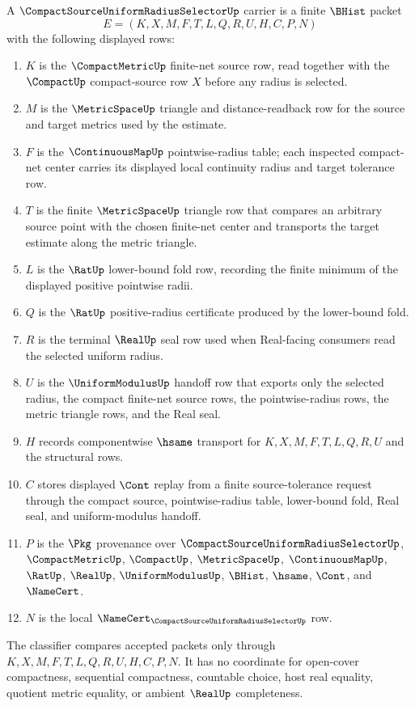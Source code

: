 \begin{definition}
\label{def:compact-source-uniform-radius-selector-carrier}
A $\CompactSourceUniformRadiusSelectorUp$ carrier is a finite $\BHist$ packet
$$
E=(K,X,M,F,T,L,Q,R,U,H,C,P,N)
$$
with the following displayed rows:
\begin{enumerate}
\item $K$ is the $\CompactMetricUp$ finite-net source row, read together with the $\CompactUp$ compact-source row $X$ before any radius is selected.
\item $M$ is the $\MetricSpaceUp$ triangle and distance-readback row for the source and target metrics used by the estimate.
\item $F$ is the $\ContinuousMapUp$ pointwise-radius table; each inspected compact-net center carries its displayed local continuity radius and target tolerance row.
\item $T$ is the finite $\MetricSpaceUp$ triangle row that compares an arbitrary source point with the chosen finite-net center and transports the target estimate along the metric triangle.
\item $L$ is the $\RatUp$ lower-bound fold row, recording the finite minimum of the displayed positive pointwise radii.
\item $Q$ is the $\RatUp$ positive-radius certificate produced by the lower-bound fold.
\item $R$ is the terminal $\RealUp$ seal row used when Real-facing consumers read the selected uniform radius.
\item $U$ is the $\UniformModulusUp$ handoff row that exports only the selected radius, the compact finite-net source rows, the pointwise-radius rows, the metric triangle rows, and the Real seal.
\item $H$ records componentwise $\hsame$ transport for $K,X,M,F,T,L,Q,R,U$ and the structural rows.
\item $C$ stores displayed $\Cont$ replay from a finite source-tolerance request through the compact source, pointwise-radius table, lower-bound fold, Real seal, and uniform-modulus handoff.
\item $P$ is the $\Pkg$ provenance over $\CompactSourceUniformRadiusSelectorUp$, $\CompactMetricUp$, $\CompactUp$, $\MetricSpaceUp$, $\ContinuousMapUp$, $\RatUp$, $\RealUp$, $\UniformModulusUp$, $\BHist$, $\hsame$, $\Cont$, and $\NameCert$.
\item $N$ is the local $\NameCert_{\CompactSourceUniformRadiusSelectorUp}$ row.
\end{enumerate}
The classifier compares accepted packets only through $K,X,M,F,T,L,Q,R,U,H,C,P,N$. It has no coordinate for open-cover compactness, sequential compactness, countable choice, host real equality, quotient metric equality, or ambient $\RealUp$ completeness.
\end{definition}

